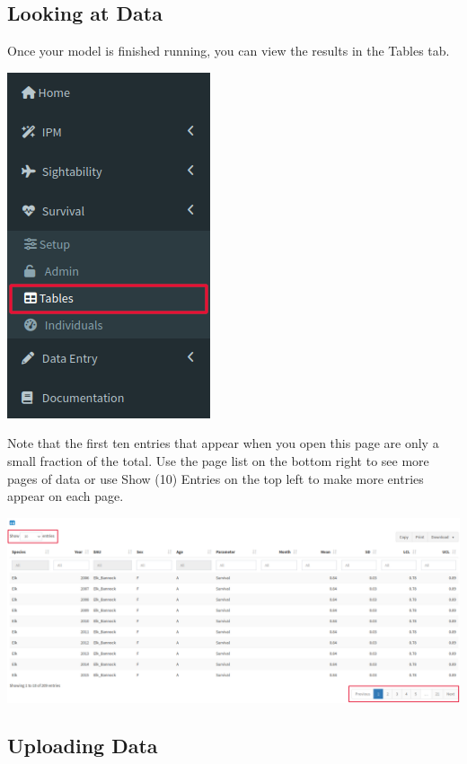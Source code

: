 \documentclass[
]{book}
\begin{document}
\hypertarget{surv-look}{%
\subsection{Looking at Data}\label{surv-look}}

Once your model is finished running, you can view the results in the Tables tab.

\includegraphics{./www/surv_walk8.png}

Note that the first ten entries that appear when you open this page are only a small fraction of the total. Use the page list on the bottom right to see more pages of data or use {Show (10) Entries} on the top left to make more entries appear on each page.

\includegraphics{./www/surv_walk9.png}

\hypertarget{surv-upload}{%
\subsection{Uploading Data}\label{surv-upload}}
\end{document}
